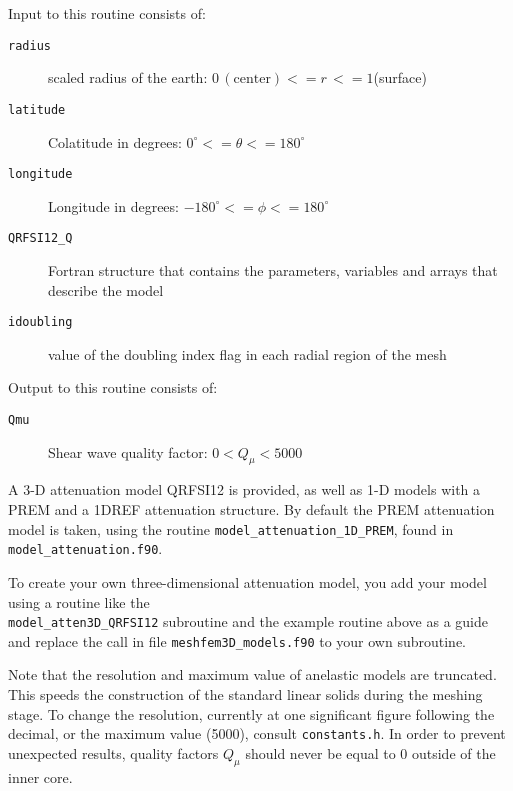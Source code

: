 \noindent
Input to this routine consists of:
\begin{description}
\item [{\texttt{radius}}] scaled radius of the earth: $0\,(\mathrm{center})<=r\,<=1$(surface)
\item [{\texttt{latitude}}] Colatitude in degrees: $0^{\circ}<=\theta<=180^{\circ}$
\item [{\texttt{longitude}}] Longitude in degrees: $-180^{\circ}<=\phi<=180^{\circ}$
\item [{\texttt{QRFSI12\_Q}}] Fortran structure that contains the parameters,
variables and arrays that describe the model
\item [{\texttt{idoubling}}] value of the doubling index flag in each radial region of the mesh
\end{description}
%
Output to this routine consists of:
\begin{description}
\item [{\texttt{Qmu}}] Shear wave quality factor: $0<Q_{\mu}<5000$
\end{description}
A 3-D attenuation model QRFSI12 \citep{DaEkDz08}
is provided, as well as 1-D models with a PREM and a 1DREF
attenuation structure. By default the PREM attenuation model is taken,
using the routine \texttt{model\_attenuation\_1D\_PREM},
found in \texttt{model\_attenuation.f90}.

To create your own three-dimensional attenuation model, you add your model
using a routine like the ~\\
\texttt{model\_atten3D\_QRFSI12} subroutine
and the example routine above as a guide and replace the call in file
\texttt{meshfem3D\_models.f90} to your own subroutine.

Note that the resolution and maximum value of anelastic models are
truncated. This speeds the construction of the standard linear solids
during the meshing stage. To change the resolution, currently at one
significant figure following the decimal, or the maximum value (5000),
consult \texttt{constants.h}. In order to prevent unexpected results,
quality factors $Q_{\mu}$ should never be equal to 0 outside of the
inner core.



